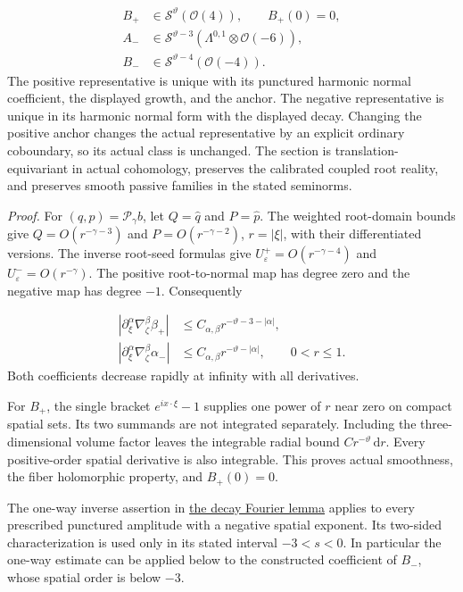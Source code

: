 \documentclass[
  english,
  11pt,
  reqno]{amsart}
\begin{document}
\label{eq:online-canonical-actual-orders} \[
\begin{aligned}
B_+&\in\mathscr S^{\vartheta}(\mathcal O(4)),\qquad B_+(0)=0,\\
A_-&\in\mathscr S^{\vartheta-3}
(\Lambda^{0,1}\otimes\mathcal O(-6)),\\
B_-&\in\mathscr S^{\vartheta-4}(\mathcal O(-4)).
\end{aligned}
\] The positive representative is unique with its punctured harmonic
normal coefficient, the displayed growth, and the anchor. The negative
representative is unique in its harmonic normal form with the displayed
decay. Changing the positive anchor changes the actual representative by
an explicit ordinary coboundary, so its actual class is unchanged. The
section is translation-equivariant in actual cohomology, preserves the
calibrated coupled root reality, and preserves smooth passive families
in the stated seminorms.

\emph{Proof.} For \((q,p)=\mathscr P_\gamma b\), let \(Q=\widehat q\)
and \(P=\widehat p\). The weighted root-domain bounds give
\(Q=O(r^{-\gamma-3})\) and \(P=O(r^{-\gamma-2})\), \(r=|\xi|\), with
their differentiated versions. The inverse root-seed formulas give
\(U^+_\varepsilon=O(r^{-\gamma-4})\) and
\(U^-_\varepsilon=O(r^{-\gamma})\). The positive root-to-normal map has
degree zero and the negative map has degree \(-1\). Consequently

\label{eq:online-canonical-normal-low-frequency-orders}
\[
\begin{aligned}
|\partial_\xi^\alpha\nabla_\zeta^\beta\beta_+|
&\le C_{\alpha,\beta}r^{-\vartheta-3-|\alpha|},\\
|\partial_\xi^\alpha\nabla_\zeta^\beta\alpha_-|
&\le C_{\alpha,\beta}r^{-\vartheta-|\alpha|},
\qquad 0<r\le1.
\end{aligned}
\] Both coefficients decrease rapidly at infinity with all derivatives.

For \(B_+\), the single bracket \(e^{ix\cdot\xi}-1\) supplies one power
of \(r\) near zero on compact spatial sets. Its two summands are not
integrated separately. Including the three-dimensional volume factor
leaves the integrable radial bound \(Cr^{-\vartheta}\,\mathrm dr\).
Every positive-order spatial derivative is also integrable. This proves
actual smoothness, the fiber holomorphic property, and \(B_+(0)=0\).

The one-way inverse assertion in
\hyperref[lem:online-decay-fourier-isomorphism]{the decay Fourier lemma}
applies to every prescribed punctured amplitude with a negative spatial
exponent. Its two-sided characterization is used only in its stated
interval \(-3<s<0\). In particular the one-way estimate can be applied
below to the constructed coefficient of \(B_-\), whose spatial order is
below \(-3\).
\end{document}
